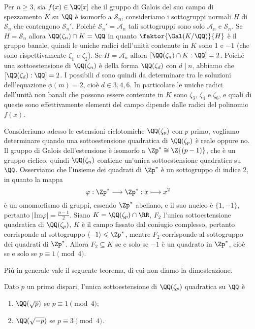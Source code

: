 \documentclass[11pt]{scrartcl}
\begin{document}
\begin{example}
    Per $n\geq 3$, sia $f(x) \in \QQ[x]$ che il gruppo di Galois del suo campo di spezzamento
    $K$ su $\QQ$ è isomorfo a $\mathcal{S}_n$, consideriamo i sottogruppi normali $H$ di $\mathcal{S}_n$
    che contengono $\mathcal{S}_n'$. Poiché $\mathcal{S}_n' = \mathcal{A}_n$ tali sottogruppi
    sono solo $\mathcal{A}_n$ e $\mathcal{S}_n$. Se $H = \mathcal{S}_n$ allora $\QQ(\zeta_n) \cap K = \nolinebreak\QQ$
    in quanto $\faktor{\Gal(K/\QQ)}{H}$ è il gruppo banale, quindi le uniche
    radici dell'unità contenute in $K$ sono 1 e $-1$ (che sono rispettivamente
    $\zeta_1$ e $\zeta_2$). Se $H = \mathcal{A}_n$
    allora $[\QQ(\zeta_n)\cap K: \QQ] = 2$. Poiché una sottoestensione di 
    $\QQ(\zeta_n)$ è della forma $\QQ(\zeta_d)$ con $d \mid n$, abbiamo
    che $[\QQ(\zeta_d):\QQ] = 2$. I possibili $d$ sono quindi da determinare
    tra le soluzioni dell'equazione $\phi(m) = 2$, cioè $d \in {3, 4, 6}$.
    In particolare le uniche radici dell'unità non banali che possono essere
    contenute in $K$ sono $\zeta_3$, $\zeta_4$ e $\zeta_6$, e quali di queste
    sono effettivamente elementi del campo dipende dalle radici del polinomio $f(x)$.
\end{example}

Consideriamo adesso le estensioni ciclotomiche $\QQ(\zeta_p)$ con $p$ primo,
vogliamo determinare quando una sottoestensione quadratica di $\QQ(\zeta_p)$
è reale oppure no. Il gruppo di Galois dell'estensione è isomorfo a $\Zp^* \cong 
\Z{(p -1)}$, che è un gruppo ciclico, quindi $\QQ(\zeta_n)$ contiene un'unica 
sottoestensione quadratica su $\QQ$. Osserviamo che l'insieme dei quadrati 
di $\Zp^*$ è un sottogruppo di indice 2, in quanto la mappa 
\[
    \varphi: \Zp^* \longrightarrow \Zp^*: x \longmapsto x^2
\]
è un omomorfismo di gruppi, essendo $\Zp^*$ abeliano, e il suo nucleo è $\{1, -1\}$,
pertanto $|\mathrm{Im}\varphi| = \displaystyle\frac{p - 1}{2}$. Siano $K = \QQ(\zeta_p)\cap \RR$,
$F_2$ l'unica sottoestensione quadratica di $\QQ(\zeta_p)$, $K$ è il campo 
fissato dal coniugio complesso, pertanto corrisponde al sottogruppo
$\langle -1\rangle \leqslant \Zp^*$, mentre $F_2$ corrisponde al sottogruppo
dei quadrati di $\Zp^*$. Allora $F_2 \subseteq K$ se e solo se $-1$ è un 
quadrato in $\Zp^*$, cioè se e solo se $p \equiv 1 \pmod 4$.

Più in generale vale il seguente teorema, di cui non diamo la dimostrazione.

\begin{theorem}
    Dato $p$ un primo dispari, l'unica sottoestensione di $\QQ(\zeta_p)$ 
    quadratica su $\QQ$ è
    \begin{enumerate}[(1)]
        \item $\QQ(\sqrt p)$ se $p \equiv 1 \pmod 4$;
        \item $\QQ(\sqrt{-p})$ se $p \equiv 3 \pmod 4$.
    \end{enumerate}
\end{theorem}   
\end{document}

